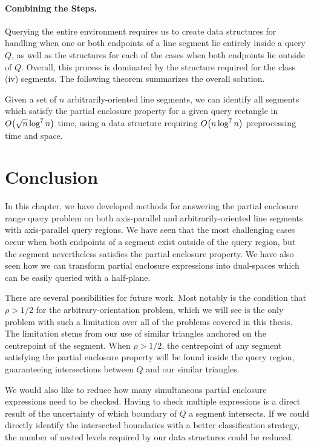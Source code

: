 \paragraph{Combining the Steps.} 

Querying the entire environment requires us to create data structures for handling when one or both endpoints of a line segment lie entirely inside a query $Q$, as well as the structures for each of the cases when both endpoints lie outside of $Q$. Overall, this process is dominated by the structure required for the class (iv) segments. The following theorem summarizes the overall solution.

\begin{theorem}
\label{th:ao}
Given a set of $n$ arbitrarily-oriented line segments, we can identify all segments which satisfy the partial enclosure property for a given query rectangle in $O\!\left(\sqrt{n}\log^7{n}\right)$ time, using a data structure requiring $O\!\left(n\log^7{n}\right)$ preprocessing time and space.
\end{theorem}


\section{Conclusion}
\label{:rectangles:concl}

In this chapter, we have developed methods for answering the partial enclosure range query problem on both axis-parallel and arbitrarily-oriented line segments with axis-parallel query regions. 
We have seen that the most challenging cases occur when both endpoints of a segment exist outside of the query region, but the segment nevertheless satisfies the partial enclosure property.  
We have also seen how we can transform partial enclosure expressions into dual-spaces which can be easily queried with a half-plane.

There are several possibilities for future work.
Most notably is the condition that $\rho > 1/2$ for the arbitrary-orientation problem, which we will see is the only problem with such a limitation over all of the problems covered in this thesis.
The limitation stems from our use of similar triangles anchored on the centrepoint of the segment.
When $\rho > 1/2$, the centrepoint of any segment satisfying the partial enclosure property will be found inside the query region, guaranteeing intersections between $Q$ and our similar triangles.

We would also like to reduce how many simultaneous partial enclosure expressions need to be checked. Having to check multiple expressions is a direct result of the uncertainty of which boundary of $Q$ a segment intersects. If we could directly identify the intersected boundaries with a better classification strategy, the number of nested levels required by our data structures could be reduced.

